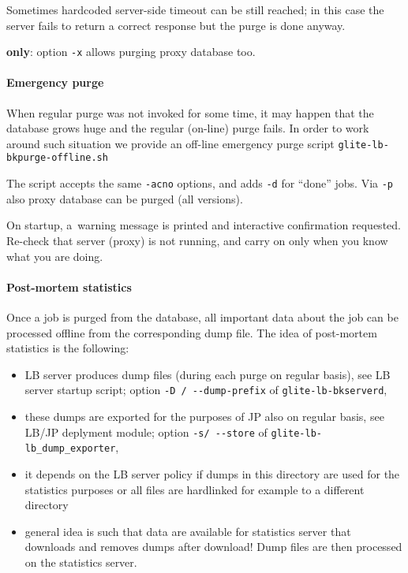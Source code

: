 Sometimes hardcoded server-side timeout can be still reached; in this case the
server fails to return a correct response but the purge is done anyway. 

\textbf{\LBnew only}: option \verb'-x' allows purging \LB proxy database too.

\paragraph{Emergency purge}

When regular purge was not invoked for some time, it may happen that 
the database grows huge and the regular (on-line) purge fails.
In order to work around such situation we provide an off-line emergency
purge script \verb'glite-lb-bkpurge-offline.sh'

The script accepts the same \verb'-acno' options, and adds \verb'-d' for ``done'' jobs. 
Via \verb'-p' also \LB proxy database can be purged (all \LB versions).

On startup, a~warning message is printed and interactive confirmation
requested.
Re-check that \LB server (proxy) is not running, and carry on only when you
know what you are doing.

\paragraph{Post-mortem statistics}

Once a job is purged from the database, all important data about the job can be
processed offline from the corresponding dump file. The idea of post-mortem
statistics is the following:

\begin{itemize}
\item LB server produces dump files (during each purge on regular basis),
see LB server startup script; option \verb'-D / --dump-prefix' of \verb'glite-lb-bkserverd',
\item these dumps are exported for the purposes of JP also on regular basis,
see LB/JP deplyment module; option \verb'-s/ --store' of \verb'glite-lb-lb_dump_exporter',
\item it depends on the LB server policy if dumps in this directory are used for
the statistics purposes or all files are hardlinked for example to a different
directory
\item general idea is such that data are available for statistics server that downloads
and removes dumps after download! Dump files are then processed on the statistics
server.
\end{itemize}

